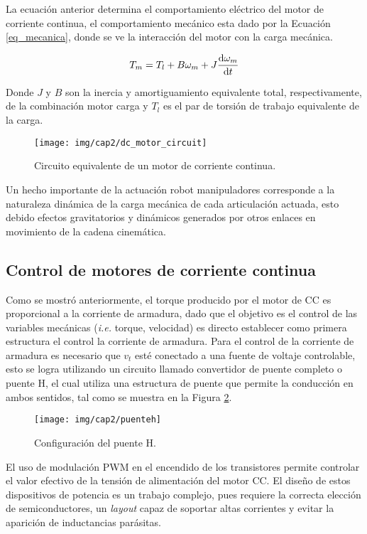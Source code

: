 La ecuación anterior determina el comportamiento eléctrico del motor de corriente continua, el comportamiento mecánico esta dado por la Ecuación \ref{eq_mecanica}, donde se ve la interacción del motor con la carga mecánica.

\begin{equation}\label{eq_mecanica}
T_m = T_l + B \omega_m + J \dv{\omega_m}{t}
\end{equation}

Donde $J$ y $B$ son la inercia y amortiguamiento equivalente total, respectivamente, de la combinación motor carga y $T_l$ es el par de torsión de trabajo equivalente de la carga.

\begin{figure}[H]
  \centering
  \texttt{[image: img/cap2/dc\_motor\_circuit]}
  \caption{Circuito equivalente de un motor de corriente continua.}
  \label{cap2_dc_motor}
\end{figure}

Un hecho importante de la actuación robot manipuladores corresponde a la naturaleza dinámica de la carga mecánica de cada articulación actuada, esto debido efectos gravitatorios y dinámicos generados por otros enlaces en movimiento de la cadena cinemática.


\subsection{Control de motores de corriente continua}

Como se mostró anteriormente, el torque producido por el motor de CC es proporcional a la corriente de armadura, dado que el objetivo es el control de las variables mecánicas (\textit{i.e.} torque, velocidad) es directo establecer como primera estructura el control la corriente de armadura. Para el control de la corriente de armadura es necesario que $v_t$ esté conectado a una fuente de voltaje controlable, esto se logra utilizando un circuito llamado convertidor de puente completo o puente H, el cual utiliza una estructura de puente que permite la conducción en ambos sentidos, tal como se muestra en la Figura \ref{cap2_punteh}.

\begin{figure}[ht]
  \centering
  \texttt{[image: img/cap2/puenteh]}
  \caption{Configuración del puente H.}
  \label{cap2_punteh}
\end{figure}

El uso de modulación PWM en el encendido de los transistores permite controlar el valor efectivo de la tensión de alimentación del motor CC. El diseño de estos dispositivos de potencia es un trabajo complejo, pues requiere la correcta elección de semiconductores, un \textit{layout} capaz de soportar altas corrientes y evitar la aparición de inductancias parásitas.

